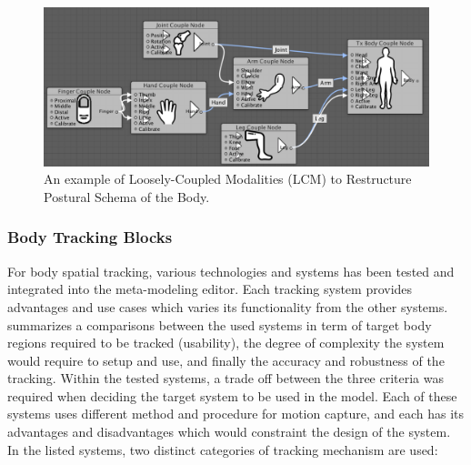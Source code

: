 \begin{figure}[htpb]
\centering
\captionsetup{justification=centering} 
\includegraphics[width=1\textwidth]{figures/system/Blocks/CouplingBody.png}
\caption{An example of Loosely-Coupled Modalities (LCM) to Restructure Postural Schema of the Body.}
  \label{fig:system-bodycoupling}
\end{figure}

\subsubsection{Body Tracking Blocks}


For body spatial tracking, various technologies and systems has been tested and integrated into the meta-modeling editor. Each tracking system provides advantages and use cases which varies its functionality from the other systems.  summarizes a comparisons between the used systems in term of target body regions required to be tracked (usability), the degree of complexity the system would require to setup and use, and finally the accuracy and robustness of the tracking. Within the tested systems, a trade off between the three criteria was required when deciding the target system to be used in the model. Each of these systems uses different method and procedure for motion capture, and each has its advantages and disadvantages which would constraint the design of the system. In the listed systems, two distinct categories of tracking mechanism are used:


